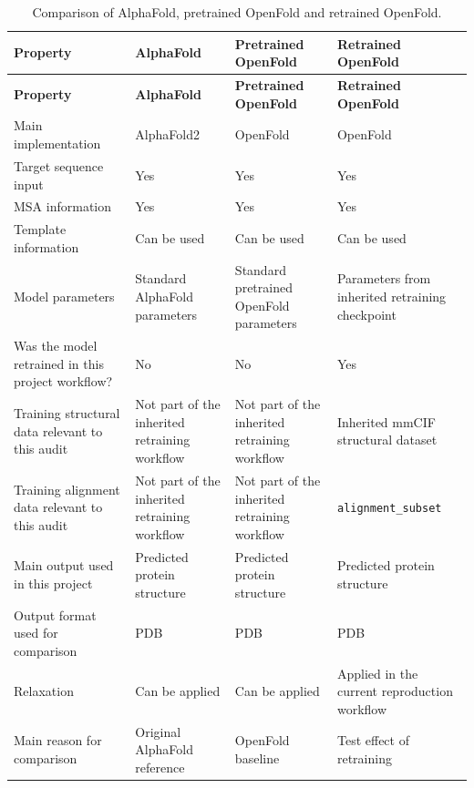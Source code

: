 \documentclass[11pt,a4paper]{article}
\begin{document}
\begin{longtable}{
>{\raggedright\arraybackslash}p{}
>{\raggedright\arraybackslash}p{}
>{\raggedright\arraybackslash}p{}
>{\raggedright\arraybackslash}p{}}

\caption{Comparison of AlphaFold, pretrained OpenFold and retrained OpenFold.}\\

\toprule
\textbf{Property} &
\textbf{AlphaFold} &
\textbf{Pretrained OpenFold} &
\textbf{Retrained OpenFold} \\
\midrule
\endfirsthead

\toprule
\textbf{Property} &
\textbf{AlphaFold} &
\textbf{Pretrained OpenFold} &
\textbf{Retrained OpenFold} \\
\midrule
\endhead

Main implementation &
AlphaFold2 &
OpenFold &
OpenFold \\

Target sequence input &
Yes &
Yes &
Yes \\

MSA information &
Yes &
Yes &
Yes \\

Template information &
Can be used &
Can be used &
Can be used \\

Model parameters &
Standard AlphaFold parameters &
Standard pretrained OpenFold parameters &
Parameters from inherited retraining checkpoint \\

Was the model retrained in this project workflow? &
No &
No &
Yes \\

Training structural data relevant to this audit &
Not part of the inherited retraining workflow &
Not part of the inherited retraining workflow &
Inherited mmCIF structural dataset \\

Training alignment data relevant to this audit &
Not part of the inherited retraining workflow &
Not part of the inherited retraining workflow &
\texttt{alignment\_subset} \\

Main output used in this project &
Predicted protein structure &
Predicted protein structure &
Predicted protein structure \\

Output format used for comparison &
PDB &
PDB &
PDB \\

Relaxation &
Can be applied &
Can be applied &
Applied in the current reproduction workflow \\

Main reason for comparison &
Original AlphaFold reference &
OpenFold baseline &
Test effect of retraining \\

\bottomrule

\end{longtable}
\end{document}
